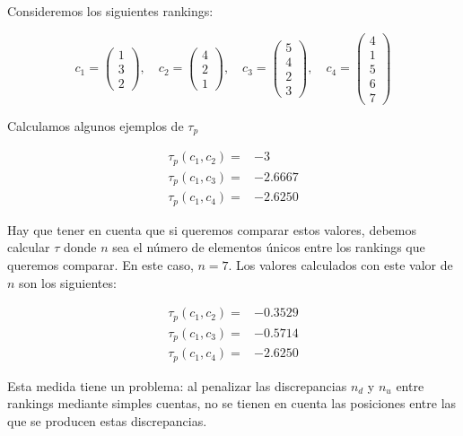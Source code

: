\begin{ejemplo}
Consideremos los siguientes rankings:

\begin{equation*}
c_1 = \left( \begin{array}{c}
1\\
3\\
2
\end{array} \right), \quad
c_2 = \left( \begin{array}{c}
4\\
2\\
1
\end{array} \right), \quad
c_3 = \left( \begin{array}{c}
5\\
4\\
2\\
3
\end{array} \right), \quad
c_4 = \left( \begin{array}{c}
4\\
1\\
5\\
6\\
7
\end{array} \right)
\end{equation*}

Calculamos algunos ejemplos de $\tau_p$

\begin{align*}
\tau_p(c_1, c_2) = & -3\\
\tau_p(c_1, c_3) = & -2.6667\\
\tau_p(c_1, c_4) = & -2.6250
\end{align*}

Hay que tener en cuenta que si queremos comparar estos valores, debemos calcular $\tau$ donde $n$ sea el número de elementos únicos entre los rankings que queremos comparar. En este caso, $n=7$. Los valores calculados con este valor de $n$ son  los siguientes:

\begin{align*}
\tau_p(c_1, c_2) = & -0.3529\\
\tau_p(c_1, c_3) = & -0.5714\\
\tau_p(c_1, c_4) = & -2.6250
\end{align*}

\end{ejemplo}

Esta medida tiene un problema: al penalizar las discrepancias $n_d$ y $n_u$ entre rankings mediante simples cuentas, no se tienen en cuenta las posiciones entre las que se producen estas discrepancias.

